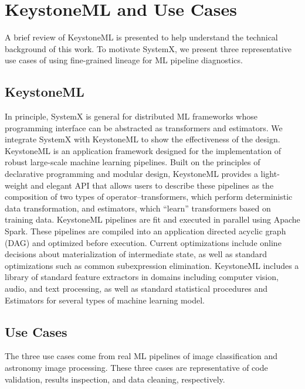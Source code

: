 \documentclass{sig-alternate}
\begin{document}
\section{K\MakeLowercase{eystone}ML and Use Cases}
\label{sec:Background}
A brief review of KeystoneML is presented to help understand the technical background of this work.
To motivate SystemX, we present three representative use cases of using fine-grained lineage for ML pipeline diagnostics.

\subsection{KeystoneML}
In principle, SystemX is general for distributed ML frameworks whose programming interface can be abstracted as transformers and estimators.
We integrate SystemX with KeystoneML to show the effectiveness of the design.
KeystoneML is an application framework designed for the implementation of robust large-scale machine learning pipelines. Built on the principles of declarative programming and modular design, KeystoneML provides a light-weight and elegant API that allows users to describe these pipelines as the composition of two types of operator--transformers, which perform deterministic data transformation, and estimators, which ``learn'' transformers based on training data. KeystoneML pipelines are fit and executed in parallel using Apache Spark. These pipelines are compiled into an application directed acyclic graph (DAG) and optimized before execution. Current optimizations include online decisions about materialization of intermediate state, as well as standard optimizations such as common subexpression elimination. KeystoneML includes a library of standard feature extractors in domains including computer vision, audio, and text processing, as well as standard statistical procedures and Estimators for several types of machine learning model.

\subsection{Use Cases}
\label{sec:Back-cases}
The three use cases come from real ML pipelines of image classification and astronomy image processing. 
These three cases are representative of code validation, results inspection, and data cleaning, respectively.
\end{document}
